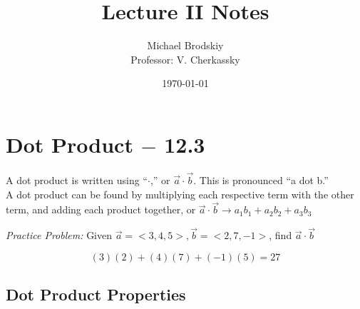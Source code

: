 \documentclass[12pt]{article}
\title{Lecture II Notes}
\date{\today}
\author{Michael Brodskiy\\ \small Professor: V. Cherkassky}
\begin{document}
\maketitle

\section{Dot Product $-$ 12.3}

A dot product is written using ``$\cdot$,'' or $\vec{a} \cdot \vec{b}$. This is pronounced ``a dot b.''\\

A dot product can be found by multiplying each respective term with the other term, and adding each product together, or $\vec{a} \cdot \vec{b} \longrightarrow a_1b_1+a_2b_2+a_3b_3$\\

\begin{flushleft}

  \textit{Practice Problem:} Given  $\vec{a} = <3, 4, 5>, \vec{b} = <2, 7, -1>$, find $\vec{a}\cdot\vec{b}$

\end{flushleft}

$$(3)(2) + (4)(7) + (-1)(5) = 27$$

\subsection{Dot Product Properties}
\end{document}
